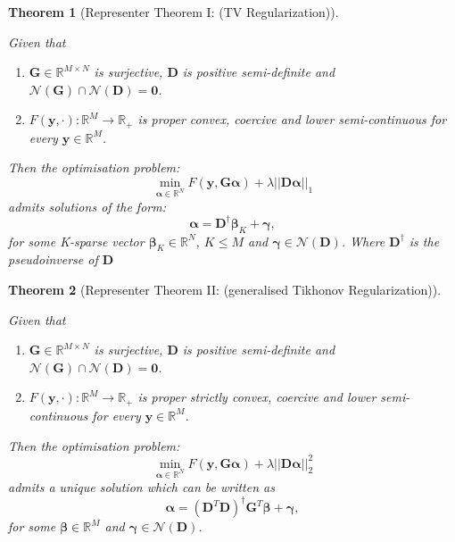 \documentclass[a4paper,11pt,oneside]{report}
\theoremstyle{named}
\newtheorem{named}{Theorem}[section]
\begin{document}
\begin{named}[Representer Theorem I: (TV Regularization)] \label{rep1}

Given that 
\begin{enumerate}
    \item $\boldsymbol{G} \in \mathbb{R}^{M \times N}$ is surjective, $\boldsymbol{D}$ is positive semi-definite and $\mathcal{N}(\boldsymbol{G}) \cap \mathcal{N}(\boldsymbol{D}) = \boldsymbol{0}$.
    \item $F(\boldsymbol{y}, \cdot) : \mathbb{R}^M \xrightarrow{} \mathbb{R}_+$ is proper convex, coercive and lower semi-continuous for every $\boldsymbol{y} \in \mathbb{R}^M$.
\end{enumerate}
Then the optimisation problem:
\begin{equation*}
    \min_{\boldsymbol{\alpha} \in \mathbb{R}^N} F(\boldsymbol{y}, \boldsymbol{G} \boldsymbol{\alpha}) + \lambda ||\boldsymbol{D \alpha} ||_1
\end{equation*}
admits solutions of the form:
\begin{equation*}
    \boldsymbol{\alpha} = \boldsymbol{D}^\dagger \boldsymbol{\beta}_K + \boldsymbol{\gamma},
\end{equation*}
for some K-sparse vector $\boldsymbol{\beta}_K \in \mathbb{R}^N$, $K\leq M$ and $\boldsymbol{\gamma} \in \mathcal{N}(\boldsymbol{D})$. Where $\boldsymbol{D}^\dagger$ is the pseudoinverse of $\boldsymbol{D}$

\end{named}


\begin{named}[Representer Theorem II: (generalised Tikhonov Regularization)] \label{rep2}

Given that 
\begin{enumerate}
    \item $\boldsymbol{G} \in \mathbb{R}^{M \times N}$ is surjective, $\boldsymbol{D}$ is positive semi-definite and $\mathcal{N}(\boldsymbol{G}) \cap \mathcal{N}(\boldsymbol{D}) = \boldsymbol{0}$.
    \item $F(\boldsymbol{y}, \cdot) : \mathbb{R}^M \xrightarrow{} \mathbb{R}_+$ is proper strictly convex, coercive and lower semi-continuous for every $\boldsymbol{y} \in \mathbb{R}^M$.
\end{enumerate}
Then the optimisation problem:
\begin{equation*}
    \min_{\boldsymbol{\alpha} \in \mathbb{R}^N} F(\boldsymbol{y}, \boldsymbol{G} \boldsymbol{\alpha}) + \lambda ||\boldsymbol{D \alpha} ||_2^2
\end{equation*}
admits a unique solution which can be written as
\begin{equation*}
    \boldsymbol{\alpha} = (\boldsymbol{D}^T\boldsymbol{D})^\dagger \boldsymbol{G}^T \boldsymbol{\beta} + \boldsymbol{\gamma},
\end{equation*}
for some $\boldsymbol{\beta} \in \mathbb{R}^M$ and $\boldsymbol{\gamma} \in \mathcal{N}(\boldsymbol{D})$.

\end{named}
\end{document}
